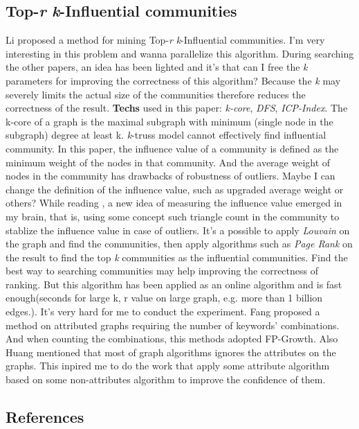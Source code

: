 \documentclass{article}
\begin{document}
	\subsection{Top-\emph{r} \emph{k}-Influential communities}
	Li\cite{li2015influential} proposed a method for mining Top-\emph{r} \emph{k}-Influential communities. I'm very interesting in this problem and wanna parallelize this algorithm. During searching the other papers, an idea has been lighted and it's that can I free the \emph{k} parameters for improving the correctness of this algorithm? Because the \emph{k} may severely limits the actual size of the communities therefore reduces the correctness of the result.
	\newline
	\textbf{Techs} used in this paper: \emph{k-core}, \emph{DFS}, \emph{ICP-Index}.
	\newline
	The k-core of a graph is the maximal subgraph with minimum (single node in the subgraph) degree at least k. \emph{k}-truss model cannot effectively find influential community.
	\newline
	In this paper, the influence value of a community is defined as the minimum weight of the nodes in that community. And the average weight of nodes in the community has drawbacks of robustness of outliers. Maybe I can change the definition of the influence value, such as upgraded average weight or others? While reading \cite{huang2015approximate}, a new idea of measuring the influence value emerged in my brain, that is, using some concept such triangle count in the community to stablize the influence value in case of outliers.
	\newline
	It's a possible to apply \emph{Louvain} on the graph and find the communities, then apply algorithms such as \emph{Page Rank} on the result to find the top \emph{k} communities as the influential communities.
	\newline
	Find the best way to searching communities may help improving the correctness of ranking.
	\newline
	But this algorithm has been applied as an online algorithm and is fast enough(seconds for large k, r value on large graph, e.g. more than 1 billion edges.). It's very hard for me to conduct the experiment.
	\newline
	Fang\cite{fang2016effective} proposed a method on attributed graphs requiring the number of keywords' combinations. And when counting the combinations, this methods adopted FP-Growth\cite{han2002fp}.
	\newline
	Also Huang\cite{huang2016attribute} mentioned that most of graph algorithms ignores the attributes on the graphs. This inpired me to do the work that apply some attribute algorithm based on some non-attributes algorithm to improve the confidence of them.

	\begin{appendix}
		\section{References}
		
		
	\end{appendix}
\end{document}
